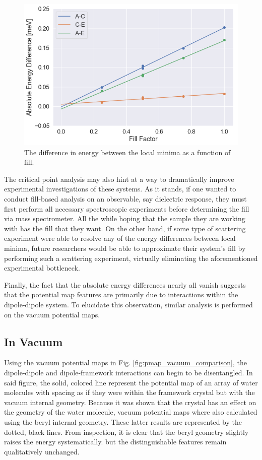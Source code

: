          \begin{figure}
             \centering
             \includegraphics[width=0.9\linewidth]{Figures/System/pmap_cp_diff.png}
             \caption{The difference in energy between the local minima as a function of fill.}
             \label{fig:pmap_cp_diff}
         \end{figure}
         
         The critical point analysis may also hint at a way to dramatically improve experimental investigations of these systems. As it stands, if one wanted to conduct fill-based analysis on an observable, say dielectric response, they must first perform all necessary spectroscopic experiments before determining the fill via mass spectrometer. All the while hoping that the sample they are working with has the fill that they want. On the other hand, if some type of scattering experiment were able to resolve any of the energy differences between local minima, future researchers would be able to approximate their system's fill by performing such a scattering experiment, virtually eliminating the aforementioned experimental bottleneck.
         
         Finally, the fact that the absolute energy differences nearly all vanish suggests that the potential map features are primarily due to interactions within the dipole-dipole system. To elucidate this observation, similar analysis is performed on the vacuum potential maps.

        \subsection{In Vacuum}
        \label{sec:fine_sweep_Vacuum}
        
        Using the vacuum potential maps in Fig. \ref{fig:pmap_vacuum_comparison}, the dipole-dipole and dipole-framework interactions can begin to be disentangled. In said figure, the solid, colored line represent the potential map of an array of water molecules with spacing as if they were within the framework crystal but with the vacuum internal geometry. Because it was shown that the crystal has an effect on the geometry of the water molecule, vacuum potential maps where also calculated using the beryl internal geometry. These latter results are represented by the dotted, black lines. From inspection, it is clear that the beryl geometry slightly raises the energy systematically. but the distinguishable features remain qualitatively unchanged.
        
